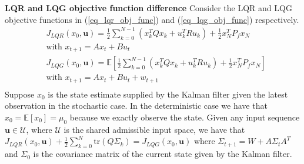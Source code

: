 \begin{thrm}
\textbf{LQR and LQG objective function difference} Consider the LQR and LQG objective functions in (\ref{eq_lqr_obj_func}) and (\ref{eq_lqg_obj_func}) respectively. 
\begin{align}
&J_{LQR}(x_0, \mathbf{u}) = \frac{1}{2}\sum_{k=0}^{N-1} \left( x_k^TQx_k + u_k^TRu_k \right) + \frac{1}{2}x_N^TP_fx_N \label{eq_lqr_obj_func} \\
& \text{with } x_{t+1} = Ax_t +Bu_t \nonumber\\
& J_{LQG}(x_0, \mathbf{u}) =  \mathbb{E}\left[ \frac{1}{2}\sum_{k=0}^{N-1} \left( x_k^TQx_k + u_k^TRu_k \right) + \frac{1}{2}x_N^TP_fx_N \right] \label{eq_lqg_obj_func} \\
& \text{with } x_{t+1} = Ax_t +Bu_t + w_{t+1} \nonumber \\
\end{align}
Suppose $x_0$ is the state estimate supplied by the Kalman filter given the latest observation in the stochastic case. In the deterministic case we have that $x_0 = \mathbb{E}[x_0] = \mu_0$ because we exactly observe the state. Given any input sequence $\mathbf{u} \in \mathcal{U}$, where $\mathcal{U}$ is the shared admissible input space, we have that $J_{LQR}(x_0, \mathbf{u}) + \frac{1}{2}\sum_{k=0}^N \text{tr}(Q\Sigma_k) = J_{LQG}(x_0, \mathbf{u})$ where $ \Sigma_{t+1} = W+A\Sigma_t A^T$ and $\Sigma_0$ is the covariance matrix of the current state given by the Kalman filter.
\label{thrm_lqr_lqg_diff}
\end{thrm}

